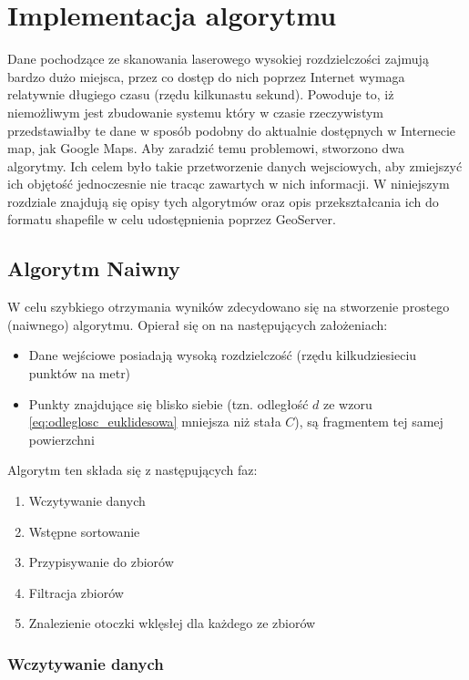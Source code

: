 \chapter{Implementacja algorytmu}
\label{chap:implementacja}

Dane pochodzące ze skanowania laserowego wysokiej rozdzielczości zajmują bardzo dużo miejsca, przez co
dostęp do nich poprzez Internet wymaga relatywnie długiego czasu (rzędu kilkunastu sekund). Powoduje to,
iż niemożliwym jest zbudowanie systemu który w czasie rzeczywistym przedstawiałby te dane w sposób podobny
do aktualnie dostępnych w Internecie map, jak Google Maps. Aby zaradzić temu problemowi, stworzono dwa algorytmy.
Ich celem było takie przetworzenie danych wejsciowych, aby zmiejszyć ich objętość jednoczesnie nie tracąc zawartych w nich informacji.
W niniejszym rozdziale znajdują się opisy tych algorytmów oraz opis przekształcania ich do formatu shapefile w celu udostępnienia
poprzez GeoServer.

\section{Algorytm Naiwny}

W celu szybkiego otrzymania wyników zdecydowano się na stworzenie prostego (naiwnego) algorytmu. Opierał się on na następujących założeniach:
\begin{itemize}
    \item Dane wejściowe posiadają wysoką rozdzielczość (rzędu kilkudziesieciu punktów na metr)
    \item Punkty znajdujące się blisko siebie (tzn. odległość $d$ ze wzoru \ref{eq:odleglosc_euklidesowa} mniejsza niż stała $C$), są fragmentem tej samej powierzchni
\end{itemize}

\noindent Algorytm ten składa się z następujących faz:
\begin{enumerate}
    \item Wczytywanie danych
    \item Wstępne sortowanie
    \item Przypisywanie do zbiorów
    \item Filtracja zbiorów
    \item Znalezienie otoczki wklęsłej dla każdego ze zbiorów
\end{enumerate}

\subsection{Wczytywanie danych}

